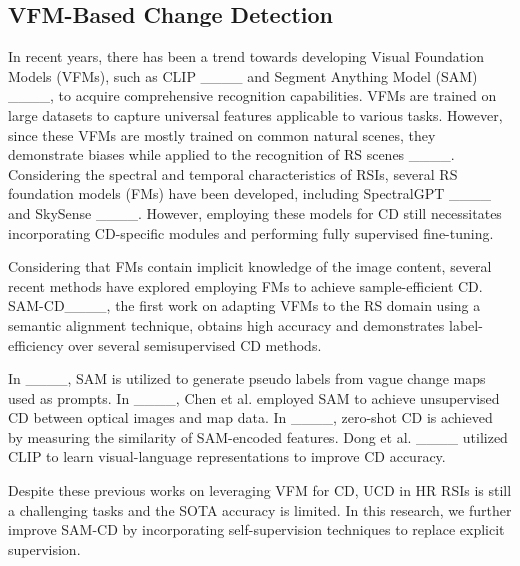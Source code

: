\subsection{VFM-Based Change Detection}

In recent years, there has been a trend towards developing Visual Foundation Models (VFMs), such as CLIP ____ and Segment Anything Model (SAM) ____, to acquire comprehensive recognition capabilities. VFMs are trained on large datasets to capture universal features applicable to various tasks. However, since these VFMs are mostly trained on common natural scenes, they demonstrate biases while applied to the recognition of RS scenes ____. Considering the spectral and temporal characteristics of RSIs, several RS foundation models (FMs) have been developed, including SpectralGPT ____ and SkySense ____. However, employing these models for CD still necessitates incorporating CD-specific modules and performing fully supervised fine-tuning.

Considering that FMs contain implicit knowledge of the image content, several recent methods have explored employing FMs to achieve sample-efficient CD. SAM-CD____, the first work on adapting VFMs to the RS domain using a semantic alignment technique, obtains high accuracy and demonstrates label-efficiency over several semisupervised CD methods. 

In ____, SAM is utilized to generate pseudo labels from vague change maps used as prompts. In ____, Chen et al. employed SAM to achieve unsupervised CD between optical images and map data. In ____, zero-shot CD is achieved by measuring the similarity of SAM-encoded features. Dong et al. ____ utilized CLIP to learn visual-language representations to improve CD accuracy.

Despite these previous works on leveraging VFM for CD, UCD in HR RSIs is still a challenging tasks and the SOTA accuracy is limited. In this research, we further improve SAM-CD by incorporating self-supervision techniques to replace explicit supervision.